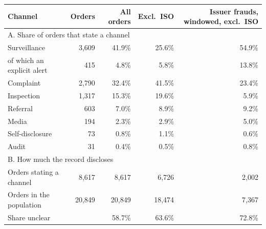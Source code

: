 \begin{tabular*}{\textwidth}[]{l@{\extracolsep\fill}rrrr}
\toprule
Channel & Orders & All orders & Excl.\ ISO & Issuer frauds, windowed, excl.\ ISO\\
\midrule
\multicolumn{5}{l}{A. Share of orders that state a channel}\\
Surveillance & 3,609 & 41.9\% & 25.6\% & 54.9\%\\
\quad of which an explicit alert & 415 & 4.8\% & 5.8\% & 13.8\%\\
Complaint & 2,790 & 32.4\% & 41.5\% & 23.4\%\\
Inspection & 1,317 & 15.3\% & 19.6\% & 5.9\%\\
Referral & 603 & 7.0\% & 8.9\% & 9.2\%\\
Media & 194 & 2.3\% & 2.9\% & 5.0\%\\
Self-disclosure & 73 & 0.8\% & 1.1\% & 0.6\%\\
Audit & 31 & 0.4\% & 0.5\% & 0.8\%\\
\midrule
\multicolumn{5}{l}{B. How much the record discloses}\\
Orders stating a channel & 8,617 & 8,617 & 6,726 & 2,002\\
Orders in the population & 20,849 & 20,849 & 18,474 & 7,367\\
Share unclear &  & 58.7\% & 63.6\% & 72.8\%\\
\bottomrule
\end{tabular*}
